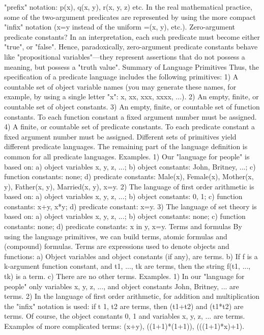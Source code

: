 "prefix" notation: p(x), q(x, y), r(x, y, z) etc. In the real mathematical practice, some of the two-argument
predicates are represented by using the more compact "infix" notation (x=y instead of the uniform =(x, y),
etc.).
Zero-argument predicate constants? In an interpretation, each such predicate must become either "true", or "false". Hence,
paradoxically, zero-argument predicate constants behave like "propositional variables"---they represent assertions that do not
possess a meaning, but possess a "truth value".
Summary of Language Primitives
Thus, the specification of a predicate language includes the following primitives:
1) A countable set of object variable names (you may generate these names, for example, by using a
single letter "x": x, xx, xxx, xxxx, ...).
2) An empty, finite, or countable set of object constants.
3) An empty, finite, or countable set of function constants. To each function constant a fixed argument
number must be assigned.
4) A finite, or countable set of predicate constants. To each predicate constant a fixed argument number
must be assigned.
Different sets of primitives yield different predicate languages. The remaining part of the language
definition is common for all predicate languages.
Examples. 1) Our "language for people" is based on: a) object variables x, y, z, ...; b) object constants: John, Britney, ...; c)
function constants: none; d) predicate constants: Male(x), Female(x), Mother(x, y), Father(x, y), Married(x, y), x=y.
2) The language of first order arithmetic is based on: a) object variables x, y, z, ...; b) object constants: 0, 1; c) function
constants: x+y, x*y; d) predicate constant: x=y.
3) The language of set theory is based on: a) object variables x, y, z, ...; b) object constants: none; c) function constants: none;
d) predicate constants: x in y, x=y.
Terms and formulas
By using the language primitives, we can build terms, atomic formulas and (compound) formulas.
Terms are expressions used to denote objects and functions:
a) Object variables and object constants (if any), are terms.
b) If f is a k-argument function constant, and t1, ..., tk are terms, then the string f(t1, ..., tk) is a term.
c) There are no other terms.
Examples. 1) In our "language for people" only variables x, y, z, ..., and object constants John, Britney, ... are terms.
2) In the language of first order arithmetic, for addition and multiplication the "infix" notation is used: if t 1, t2 are terms, then
(t1+t2) and (t1*t2) are terms. Of course, the object constants 0, 1 and variables x, y, z, ... are terms. Examples of more
complicated terms: (x+y), ((1+1)*(1+1)), (((1+1)*x)+1).
